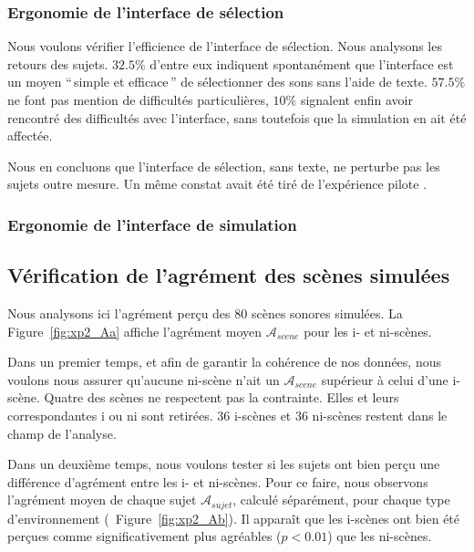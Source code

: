 \subsubsection{Ergonomie de l'interface de sélection}

Nous voulons vérifier l'efficience de l'interface de sélection. Nous analysons les retours des sujets. $32.5\%$ d'entre eux indiquent spontanément que l'interface est un moyen ``\,simple et efficace\,'' de sélectionner des sons sans l'aide de texte. $57.5\%$ ne font pas mention de difficultés particulières, $10\%$ signalent enfin avoir rencontré des difficultés avec l'interface, sans toutefois que la simulation en ait été affectée.

Nous en concluons que l'interface de sélection, sans texte, ne perturbe pas les sujets outre mesure. Un même constat avait été tiré de l'expérience pilote \citep{lafay2013atiam,lafay2014new}. 

\subsubsection{Ergonomie de l'interface de simulation}

\subsection{Vérification de l'agrément des scènes simulées}

Nous analysons ici l'agrément perçu des $80$ scènes sonores simulées. La Figure~\ref{fig:xp2_Aa} affiche l'agrément moyen $\mathcal{A}_{scene}$ pour les i- et ni-scènes. 

Dans un premier temps, et afin de garantir la cohérence de nos données, nous voulons nous assurer qu'aucune ni-scène n'ait un $\mathcal{A}_{scene}$ supérieur à celui d'une i-scène. Quatre des scènes ne respectent pas la contrainte. Elles et leurs correspondantes i ou ni sont retirées. 36 i-scènes et 36 ni-scènes restent dans le champ de l'analyse.

Dans un deuxième temps, nous voulons tester si les sujets ont bien perçu une différence d'agrément entre les i- et ni-scènes. Pour ce faire, nous observons l'agrément moyen de chaque sujet $\mathcal{A}_{sujet}$, calculé séparément, pour chaque type d'environnement (\cf~Figure~\ref{fig:xp2_Ab}). Il apparaît que les i-scènes ont bien été perçues comme significativement plus agréables ($p<0.01$) que les ni-scènes.

